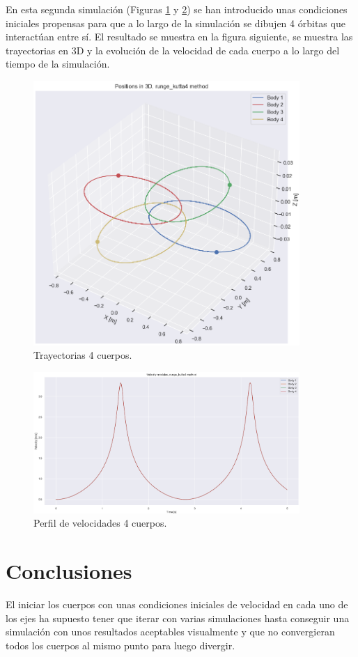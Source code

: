 \documentclass[12pt,a4paper]{article}
\begin{document}
En esta segunda simulación (Figuras \ref{4_body_3D_2} y \ref{4_body_vel_2}) se han introducido unas condiciones iniciales propensas para que a lo largo de la simulación se dibujen 4 órbitas que interactúan entre sí. El resultado se muestra en la figura siguiente, se muestra las trayectorias en 3D y la evolución de la velocidad de cada cuerpo a lo largo del tiempo de la simulación.
\begin{figure}[H]
	\centering
	\includegraphics[width=0.90\textwidth]{FIGURES/mil5/4nb_plot3D_2.png}
	\caption{Trayectorias 4 cuerpos.}
	\label{4_body_3D_2}
\end{figure}
\begin{figure}[H]
	\centering
	\includegraphics[width=0.90\textwidth]{FIGURES/mil5/4nb_vel_2.png}
	\caption{Perfil de velocidades 4 cuerpos.}
	\label{4_body_vel_2}
\end{figure}



\section{Conclusiones}
El iniciar los cuerpos con unas condiciones iniciales de velocidad en cada uno de los ejes ha supuesto tener que iterar con varias simulaciones hasta conseguir una simulación con unos resultados aceptables visualmente y que no convergieran todos los cuerpos al mismo punto para luego divergir. 
\end{document}
